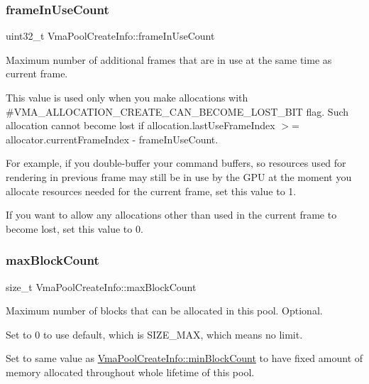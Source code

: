 \subsubsection{\texorpdfstring{frame\+In\+Use\+Count}{frameInUseCount}}
{\footnotesize\ttfamily uint32\+\_\+t Vma\+Pool\+Create\+Info\+::frame\+In\+Use\+Count}



Maximum number of additional frames that are in use at the same time as current frame. 

This value is used only when you make allocations with \#\+V\+M\+A\+\_\+\+A\+L\+L\+O\+C\+A\+T\+I\+O\+N\+\_\+\+C\+R\+E\+A\+T\+E\+\_\+\+C\+A\+N\+\_\+\+B\+E\+C\+O\+M\+E\+\_\+\+L\+O\+S\+T\+\_\+\+B\+IT flag. Such allocation cannot become lost if allocation.\+last\+Use\+Frame\+Index $>$= allocator.\+current\+Frame\+Index -\/ frame\+In\+Use\+Count.

For example, if you double-\/buffer your command buffers, so resources used for rendering in previous frame may still be in use by the G\+PU at the moment you allocate resources needed for the current frame, set this value to 1.

If you want to allow any allocations other than used in the current frame to become lost, set this value to 0. \mbox{\label{structVmaPoolCreateInfo_ae41142f2834fcdc82baa4883c187b75c}} 
\subsubsection{\texorpdfstring{max\+Block\+Count}{maxBlockCount}}
{\footnotesize\ttfamily size\+\_\+t Vma\+Pool\+Create\+Info\+::max\+Block\+Count}



Maximum number of blocks that can be allocated in this pool. Optional. 

Set to 0 to use default, which is {\ttfamily S\+I\+Z\+E\+\_\+\+M\+AX}, which means no limit.

Set to same value as \hyperlink{structVmaPoolCreateInfo_ad8006fb803185c0a699d30f3e9a865ae}{Vma\+Pool\+Create\+Info\+::min\+Block\+Count} to have fixed amount of memory allocated throughout whole lifetime of this pool. \mbox{\label{structVmaPoolCreateInfo_ad8006fb803185c0a699d30f3e9a865ae}} 
